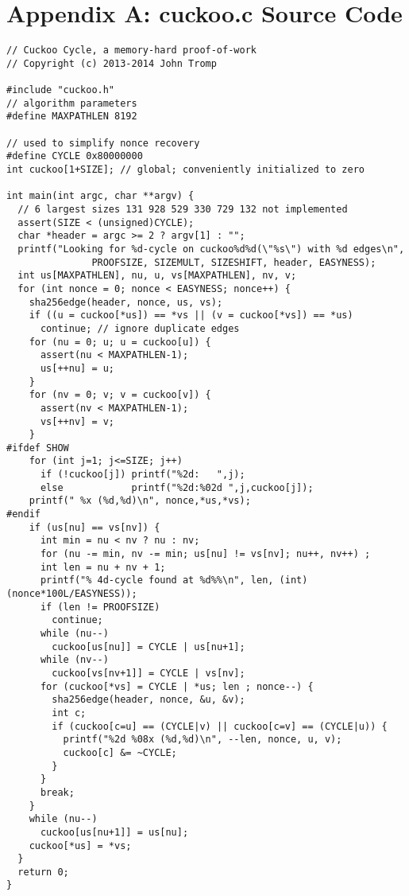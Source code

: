 \documentclass[11pt, oneside]{article}
\begin{document}
\section{Appendix A: cuckoo.c Source Code}
\footnotesize
\begin{verbatim}
// Cuckoo Cycle, a memory-hard proof-of-work
// Copyright (c) 2013-2014 John Tromp

#include "cuckoo.h"
// algorithm parameters
#define MAXPATHLEN 8192

// used to simplify nonce recovery
#define CYCLE 0x80000000
int cuckoo[1+SIZE]; // global; conveniently initialized to zero

int main(int argc, char **argv) {
  // 6 largest sizes 131 928 529 330 729 132 not implemented
  assert(SIZE < (unsigned)CYCLE);
  char *header = argc >= 2 ? argv[1] : "";
  printf("Looking for %d-cycle on cuckoo%d%d(\"%s\") with %d edges\n",
               PROOFSIZE, SIZEMULT, SIZESHIFT, header, EASYNESS);
  int us[MAXPATHLEN], nu, u, vs[MAXPATHLEN], nv, v; 
  for (int nonce = 0; nonce < EASYNESS; nonce++) {
    sha256edge(header, nonce, us, vs);
    if ((u = cuckoo[*us]) == *vs || (v = cuckoo[*vs]) == *us)
      continue; // ignore duplicate edges
    for (nu = 0; u; u = cuckoo[u]) {
      assert(nu < MAXPATHLEN-1);
      us[++nu] = u;
    }
    for (nv = 0; v; v = cuckoo[v]) {
      assert(nv < MAXPATHLEN-1);
      vs[++nv] = v;
    }
#ifdef SHOW
    for (int j=1; j<=SIZE; j++)
      if (!cuckoo[j]) printf("%2d:   ",j);
      else            printf("%2d:%02d ",j,cuckoo[j]);
    printf(" %x (%d,%d)\n", nonce,*us,*vs);
#endif
    if (us[nu] == vs[nv]) {
      int min = nu < nv ? nu : nv;
      for (nu -= min, nv -= min; us[nu] != vs[nv]; nu++, nv++) ;
      int len = nu + nv + 1;
      printf("% 4d-cycle found at %d%%\n", len, (int)(nonce*100L/EASYNESS));
      if (len != PROOFSIZE)
        continue;
      while (nu--)
        cuckoo[us[nu]] = CYCLE | us[nu+1];
      while (nv--)
        cuckoo[vs[nv+1]] = CYCLE | vs[nv];
      for (cuckoo[*vs] = CYCLE | *us; len ; nonce--) {
        sha256edge(header, nonce, &u, &v);
        int c;
        if (cuckoo[c=u] == (CYCLE|v) || cuckoo[c=v] == (CYCLE|u)) {
          printf("%2d %08x (%d,%d)\n", --len, nonce, u, v);
          cuckoo[c] &= ~CYCLE;
        }
      }
      break;
    }
    while (nu--)
      cuckoo[us[nu+1]] = us[nu];
    cuckoo[*us] = *vs;
  }
  return 0;
}
\end{verbatim}
\end{document}

